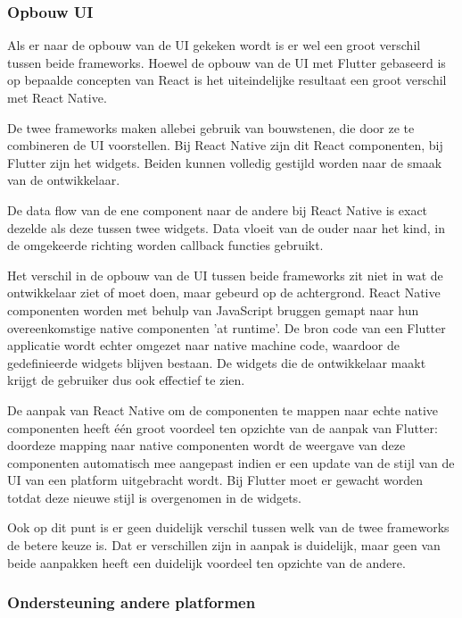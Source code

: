 \subsubsection{Opbouw UI}

Als er naar de opbouw van de UI gekeken wordt is er wel een groot verschil tussen beide frameworks. Hoewel de opbouw van de UI met Flutter gebaseerd is op bepaalde concepten van React is het uiteindelijke resultaat een groot verschil met React Native.

De twee frameworks maken allebei gebruik van bouwstenen, die door ze te combineren de UI voorstellen. Bij React Native zijn dit React componenten, bij Flutter zijn het widgets. Beiden kunnen volledig gestijld worden naar de smaak van de ontwikkelaar. 

De data flow van de ene component naar de andere bij React Native is exact dezelde als deze tussen twee widgets. Data vloeit van de ouder naar het kind, in de omgekeerde richting worden callback functies gebruikt.

Het verschil in de opbouw van de UI tussen beide frameworks zit niet in wat de ontwikkelaar ziet of moet doen, maar gebeurd op de achtergrond. React Native componenten worden met behulp van JavaScript bruggen gemapt naar hun overeenkomstige native componenten 'at runtime'. De bron code van een Flutter applicatie wordt echter omgezet naar native machine code, waardoor de gedefinieerde widgets blijven bestaan. De widgets die de ontwikkelaar maakt krijgt de gebruiker dus ook effectief te zien. 

De aanpak van React Native om de componenten te mappen naar echte native componenten heeft één groot voordeel ten opzichte van de aanpak van Flutter: doordeze mapping naar native componenten wordt de weergave van deze componenten automatisch mee aangepast indien er een update van de stijl van de UI van een platform uitgebracht wordt. Bij Flutter moet er gewacht worden totdat deze nieuwe stijl is overgenomen in de widgets. 

Ook op dit punt is er geen duidelijk verschil tussen welk van de twee frameworks de betere keuze is. Dat er verschillen zijn in aanpak is duidelijk, maar geen van beide aanpakken heeft een duidelijk voordeel ten opzichte van de andere. 

\subsubsection{Ondersteuning andere platformen}

